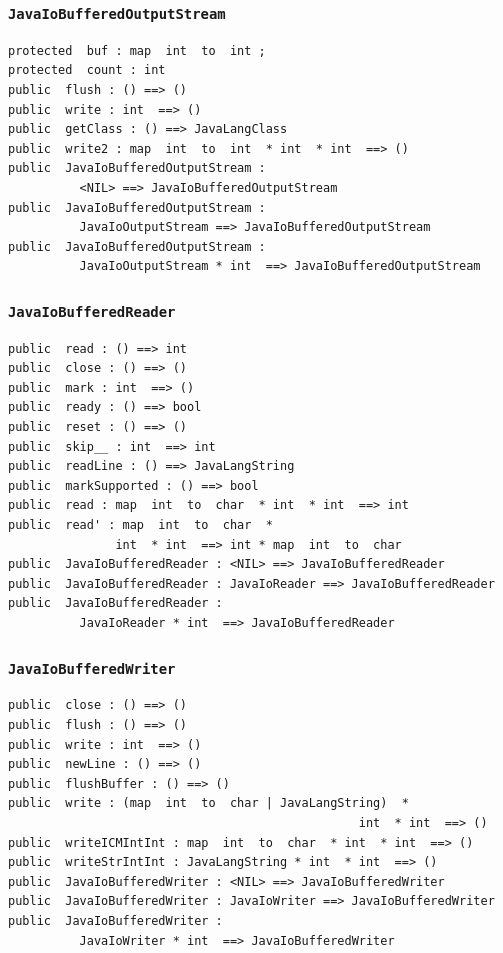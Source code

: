 \documentclass[\pformat,12pt]{article}
\begin{document}
\subsubsection{\texttt{JavaIoBufferedOutputStream}}
\begin{small}
\begin{verbatim}
protected  buf : map  int  to  int ;
protected  count : int
public  flush : () ==> ()
public  write : int  ==> ()
public  getClass : () ==> JavaLangClass
public  write2 : map  int  to  int  * int  * int  ==> ()
public  JavaIoBufferedOutputStream : 
          <NIL> ==> JavaIoBufferedOutputStream
public  JavaIoBufferedOutputStream : 
          JavaIoOutputStream ==> JavaIoBufferedOutputStream
public  JavaIoBufferedOutputStream : 
          JavaIoOutputStream * int  ==> JavaIoBufferedOutputStream
\end{verbatim}
\end{small}

\subsubsection{\texttt{JavaIoBufferedReader}}
\begin{small}
\begin{verbatim}
public  read : () ==> int
public  close : () ==> ()
public  mark : int  ==> ()
public  ready : () ==> bool
public  reset : () ==> ()
public  skip__ : int  ==> int
public  readLine : () ==> JavaLangString
public  markSupported : () ==> bool
public  read : map  int  to  char  * int  * int  ==> int
public  read' : map  int  to  char  * 
               int  * int  ==> int * map  int  to  char
public  JavaIoBufferedReader : <NIL> ==> JavaIoBufferedReader
public  JavaIoBufferedReader : JavaIoReader ==> JavaIoBufferedReader
public  JavaIoBufferedReader : 
          JavaIoReader * int  ==> JavaIoBufferedReader
\end{verbatim}
\end{small}

\subsubsection{\texttt{JavaIoBufferedWriter}}
\begin{small}
\begin{verbatim}
public  close : () ==> ()
public  flush : () ==> ()
public  write : int  ==> ()
public  newLine : () ==> ()
public  flushBuffer : () ==> ()
public  write : (map  int  to  char | JavaLangString)  * 
                                                 int  * int  ==> ()
public  writeICMIntInt : map  int  to  char  * int  * int  ==> ()
public  writeStrIntInt : JavaLangString * int  * int  ==> ()
public  JavaIoBufferedWriter : <NIL> ==> JavaIoBufferedWriter
public  JavaIoBufferedWriter : JavaIoWriter ==> JavaIoBufferedWriter
public  JavaIoBufferedWriter : 
          JavaIoWriter * int  ==> JavaIoBufferedWriter
\end{verbatim}
\end{small}
\end{document}
